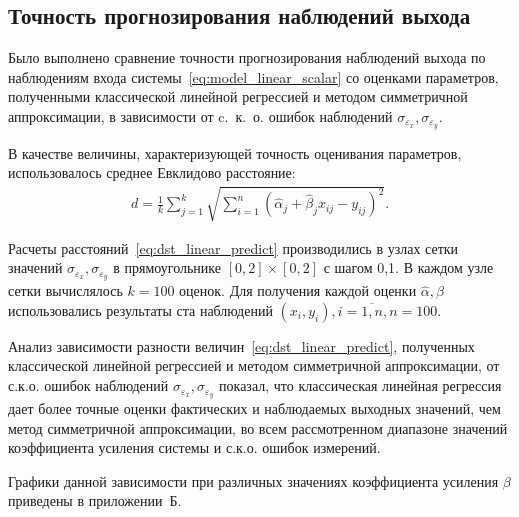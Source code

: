 \subsection{Точность прогнозирования наблюдений выхода}

Было выполнено сравнение точности прогнозирования наблюдений выхода по наблюдениям входа
системы~\eqref{eq:model_linear_scalar} со оценками параметров,
полученными классической линейной регрессией и методом симметричной аппроксимации,
в зависимости от c.~к.~о. ошибок наблюдений \( \sigma_{\varepsilon_x}, \sigma_{\varepsilon_y} \).

В качестве величины, характеризующей точность оценивания параметров,
использовалось среднее Евклидово расстояние:
\begin{equation}
  \begin{aligned}
    d = \frac{1}{k} \sum_{j=1}^k \sqrt{ \sum_{i=1}^n (\hat{\alpha}_j + \hat{\beta}_j x_{ij} - y_{ij})^2}.
    \end{aligned}
  \label{eq:dst_linear_predict}
\end{equation}

Расчеты расстояний~\eqref{eq:dst_linear_predict} производились в узлах сетки значений
\( \sigma_{\varepsilon_x}, \sigma_{\varepsilon_y} \) в прямоугольнике
\( [0, 2] \times [0, 2] \) с шагом 0{,}1.
В каждом узле сетки вычислялось \( k = 100 \) оценок.
Для получения каждой оценки \( \hat{\alpha}, \hat{\beta} \) использовались результаты
ста наблюдений \( ( x_i, y_i ), i = \overline{1, n}, n = 100 \).

Анализ зависимости разности величин~\eqref{eq:dst_linear_predict},
полученных классической линейной регрессией и методом симметричной аппроксимации,
от с.к.о. ошибок наблюдений \( \sigma_{\varepsilon_x}, \sigma_{\varepsilon_y} \) показал, что
классическая линейная регрессия дает более точные оценки фактических и наблюдаемых выходных
значений, чем метод симметричной аппроксимации,
во всем рассмотренном диапазоне значений коэффициента усиления системы и с.к.о. ошибок измерений.

Графики данной зависимости при различных значениях коэффициента усиления \( \beta \)
приведены в приложении~Б.


